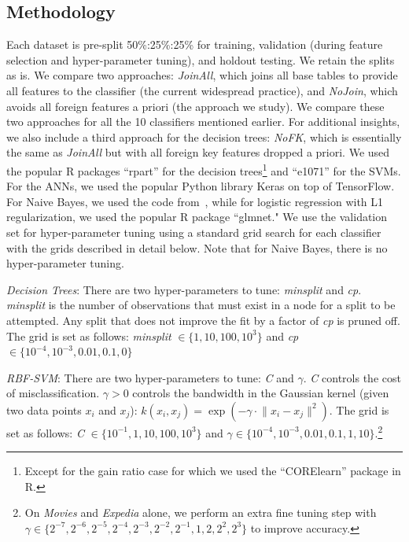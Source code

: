 \documentclass{vldb}
\begin{document}
\subsection{Methodology}
Each dataset is pre-split 50\%:25\%:25\% for training, validation (during feature selection and hyper-parameter tuning), and holdout testing. We retain the splits as is.
We compare two approaches: \textit{JoinAll}, which joins all base tables to provide all features to the classifier (the current widespread practice), and \textit{NoJoin},
which avoids all foreign features a priori (the approach we study). We compare these two approaches for all the 10 classifiers mentioned earlier. For additional insights, 
we also include a third approach for the decision trees: \textit{NoFK}, which is essentially the same as  \textit{JoinAll} but with all foreign key features dropped a priori.
We used the popular R packages ``rpart'' for the decision trees\footnote{Except for the gain ratio case for which we used the ``CORElearn'' package in R.} 
and ``e1071'' for the SVMs.  For the ANNs, we used the popular Python library Keras on top of TensorFlow.
For Naive Bayes, we used the code from~\cite{hamlet}, while for logistic regression with L1 regularization, we used the popular R package ``glmnet."
We use the validation set for hyper-parameter tuning using a standard grid search for each classifier with the grids described in detail below. Note that 
for Naive Bayes, there is no hyper-parameter tuning.

\vspace{2mm}
\textit{Decision Trees}: There are two hyper-parameters to tune: \textit{minsplit} and \textit{cp}. \textit{minsplit} is the number of observations that 
must exist in a node for a split to be attempted. Any split that does not improve the fit by a factor of \textit{cp} is pruned off. 
The grid is set as follows: \textit{minsplit} $\in \{ 1, 10, 100, 10^3\}$ and \textit{cp} $\in \{10^{-4}, 10^{-3}, 0.01, 0.1, 0\}$   

\vspace{2mm}
\textit{RBF-SVM}: There are two hyper-parameters to tune: \textit{C} and $\gamma$. 
\textit{C} controls the cost of misclassification. $\gamma > 0$ controls the bandwidth in the Gaussian kernel 
(given two data points $x_i$ and $x_j$): $k(x_i,x_j) = \exp(-\gamma \cdot \lVert{x_i - x_j} \rVert ^2 )$.
The grid is set as follows: \textit{C} $\in \{10^{-1}, 1, 10, 100, 10^3\}$ and $\gamma \in \{10^{-4}, 10^{-3}, 0.01, 0.1, 1, 10\}$.\footnote{On 
\textit{Movies} and \textit{Expedia} alone, we perform an extra fine tuning step with 
$\gamma \in \{2^{-7}, 2^{-6},2^{-5}, 2^{-4}, 2^{-3}, 2^{-2},2^{-1}, 1,2, 2^{2}, 2^{3}\}$ to improve accuracy.}
\end{document}
